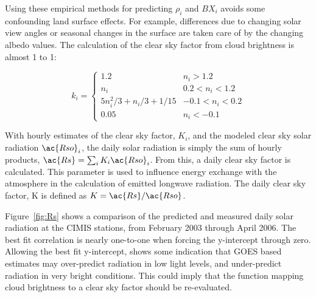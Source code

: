 \documentclass[reviewcopy]{elsart}
\begin{document}
Using these empirical methods for predicting $\rho_i$ and $BX_i$
avoids some confounding land surface effects.  For example,
differences due to changing solar view angles or seasonal changes in
the surface are taken care of by the changing albedo values.  The
calculation of the clear sky factor from cloud brightness is almost 1
to 1:

\begin{equation}
  k_i= \begin{cases}
    1.2 & n_i > 1.2 \\
    n_i & 0.2 < n_i < 1.2 \\
    5n_i^2/3+n_i/3 +1/15 & -0.1 < n_i < 0.2 \\
    0.05 & n_i < -0.1 
  \end{cases}
\end{equation}

With hourly estimates of the clear sky factor, $K_i$, and the modeled
clear sky solar radiation ${\ac{Rso}}_i$, the daily solar radiation
is simply the sum of hourly products, $\ac{Rs}=\sum_{i}
K_i{\ac{Rso}}_i$.  From this, a daily clear sky factor is calculated.
This parameter is used to influence energy exchange with the
atmosphere in the calculation of emitted longwave radiation.  The
daily clear sky factor, \ac{K} is defined as
$K=\ac{Rs}/\ac{Rso}$.

Figure~\ref{fig:Rs} shows a comparison of the predicted and measured
daily solar radiation at the \ac{CIMIS} stations, from February 2003
through April 2006.  The best fit correlation is nearly one-to-one
when forcing the y-intercept through zero.  Allowing the best fit
y-intercept, shows some indication that \ac{GOES} based estimates may
over-predict radiation in low light levels, and under-predict
radiation in very bright conditions.  This could imply that the
function mapping cloud brightness to a clear sky factor should be
re-evaluated.
\end{document}
